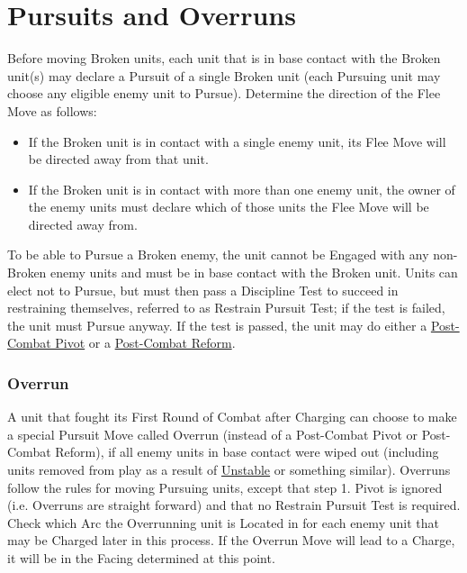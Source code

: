 \section{Pursuits and Overruns}
\label{pursuits_and_overruns}

Before moving Broken units, each unit that is in base contact with the Broken unit(s) may declare a Pursuit of a single Broken unit (each Pursuing unit may choose any eligible enemy unit to Pursue). Determine the direction of the Flee Move as follows:
\begin{itemize}
\item If the Broken unit is in contact with a single enemy unit, its Flee Move will be directed away from that unit.
\item If the Broken unit is in contact with more than one enemy unit, the owner of the enemy units must declare which of those units the Flee Move will be directed away from.
\end{itemize}

To be able to Pursue a Broken enemy, the unit cannot be Engaged with any non-Broken enemy units and must be in base contact with the Broken unit. Units can elect not to Pursue, but must then pass a Discipline Test to succeed in restraining themselves, referred to as Restrain Pursuit Test; if the test is failed, the unit must Pursue anyway. If the test is passed, the unit may do either a \hyperref[post_combat_pivot]{Post-Combat Pivot} or a \hyperref[post_combat_reform]{Post-Combat Reform}.

\subsubsection{Overrun}
\label{overrun}

A unit that fought its First Round of Combat after Charging  can choose to make a special Pursuit Move called Overrun (instead of a Post-Combat Pivot or Post-Combat Reform), if all enemy units in base contact were wiped out (including units removed from play as a result of \hyperref[unstable]{Unstable} or something similar). Overruns follow the rules for moving Pursuing units, except that step 1. Pivot is ignored (i.e. Overruns are straight forward) and that no Restrain Pursuit Test is required. Check which Arc the Overrunning unit is Located in for each enemy unit that may be Charged later in this process. If the Overrun Move will lead to a Charge, it will be in the Facing determined at this point.

